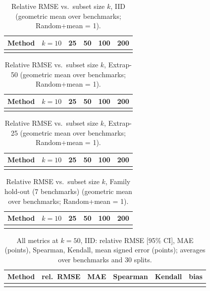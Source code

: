 \begin{table}[h]
\caption{Relative RMSE vs.\ subset size $k$, IID (geometric mean over benchmarks; Random+mean = 1).}
\label{tab:relk_iid}
\centering\footnotesize
\begin{tabular}{lccccc}
\toprule
Method & $k{=}10$ & 25 & 50 & 100 & 200\\
\midrule
\\
\bottomrule
\end{tabular}
\end{table}
\begin{table}[h]
\caption{Relative RMSE vs.\ subset size $k$, Extrap-50 (geometric mean over benchmarks; Random+mean = 1).}
\label{tab:relk_up50}
\centering\footnotesize
\begin{tabular}{lccccc}
\toprule
Method & $k{=}10$ & 25 & 50 & 100 & 200\\
\midrule
\\
\bottomrule
\end{tabular}
\end{table}
\begin{table}[h]
\caption{Relative RMSE vs.\ subset size $k$, Extrap-25 (geometric mean over benchmarks; Random+mean = 1).}
\label{tab:relk_up75}
\centering\footnotesize
\begin{tabular}{lccccc}
\toprule
Method & $k{=}10$ & 25 & 50 & 100 & 200\\
\midrule
\\
\bottomrule
\end{tabular}
\end{table}
\begin{table}[h]
\caption{Relative RMSE vs.\ subset size $k$, Family hold-out (7 benchmarks) (geometric mean over benchmarks; Random+mean = 1).}
\label{tab:relk_fam}
\centering\footnotesize
\begin{tabular}{lccccc}
\toprule
Method & $k{=}10$ & 25 & 50 & 100 & 200\\
\midrule
\\
\bottomrule
\end{tabular}
\end{table}
\begin{table}[h]
\caption{All metrics at $k=50$, IID: relative RMSE [95\% CI], MAE (points), Spearman, Kendall, mean signed error (points); averages over benchmarks and 30 splits.}
\label{tab:full_iid}
\centering\footnotesize
\begin{tabular}{lccccc}
\toprule
Method & rel.\ RMSE & MAE & Spearman & Kendall & bias\\
\midrule
\\
\bottomrule
\end{tabular}
\end{table}
